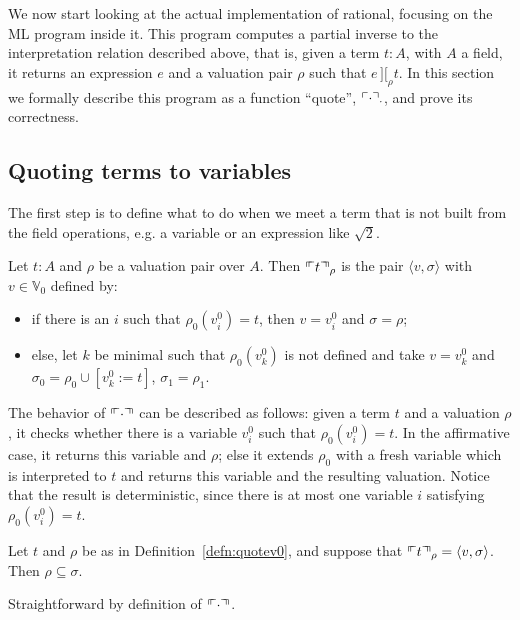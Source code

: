 \documentclass[numreferences]{kluwer}
\newcommand{\intII}{\,]\![}
\newcommand{\intrel}{\mathbin{\intII_{\rho}}}
\newcommand{\V}{{\mathbb V}}
\newcommand{\tacticname}[1]{\textsf{#1}}
\newcommand{\rational}{\tacticname{rational}}
\newcommand{\mlfnv}[2]{\ensuremath\ulcorner\!\!\ulcorner{#1}\urcorner\!\!\urcorner_{#2}}
\newcommand{\mlfn}[2]{\ensuremath\ulcorner{#1}\urcorner_{#2}}
\newcommand{\domain}{\ensuremath{\mathrm{dom}}}
\begin{document}
\begin{article}
We now start looking at the actual implementation of {\rational}, focusing
on the ML program inside it.
This program computes a partial
inverse to the interpretation relation described above, that is, given
a term $t:A$, with $A$ a field, it returns an expression $e$
and a valuation pair $\rho$ such that $e\intrel t$.
In this section we formally describe this program as a function
``quote'', $\mlfn{\cdot}{\cdot}$, and prove its correctness.

\subsection{Quoting terms to variables}

The first step is to define what to do when we meet a term that is not
built from the field operations, e.g. a variable or an expression
like $\sqrt 2$.

\begin{definition}\label{defn:quotev0}
Let $t:A$ and $\rho$ be a valuation pair over $A$.  Then
$\mlfnv{t}{\rho}$ is the pair $\langle v,\sigma\rangle$ with $v\in\V_0$
defined by:
\begin{itemize}
\item if there is an $i$ such that $\rho_0(v^0_i)=t$, then $v=v^0_i$ and
$\sigma=\rho$;
\item else, let $k$ be minimal such that $\rho_0(v^0_k)$ is not defined
and take $v=v^0_k$ and $\sigma_0=\rho_0\cup[v^0_k:=t]$, $\sigma_1=\rho_1$.
\end{itemize}
The behavior of $\mlfnv{\cdot}{}$ can be described as follows: given a term $t$ and
a valuation $\rho$, it checks whether there is a variable $v^0_i$ such that
$\rho_0(v^0_i)=t$.  In the affirmative case, it returns this variable and
$\rho$; else it extends $\rho_0$ with a fresh variable which is interpreted
to $t$ and returns this variable and the resulting valuation.  Notice
that the result is deterministic, since there is at most one variable $i$
satisfying $\rho_0(v^0_i)=t$.
\end{definition}

\begin{lemma}\label{quotev0incl}
Let $t$ and $\rho$ be as in Definition~\ref{defn:quotev0}, and suppose
that $\mlfnv{t}{\rho}=\langle v,\sigma\rangle$.  Then $\rho\subseteq\sigma$.
\end{lemma}
\begin{pf}
Straightforward by definition of $\mlfnv{\cdot}{}$.
\end{pf}


\end{article}
\end{document}
